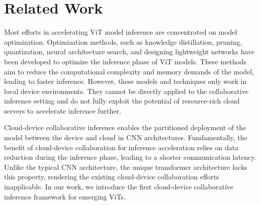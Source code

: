 \section{Related Work}
\label{sec:Related Work}
Most efforts in accelerating ViT model inference are concentrated on model optimization. 
Optimization methods, such as knowledge distillation\cite{hao2022learning}, pruning\cite{pan2021iared,tang2022patch,xu2022evovit,yu2022width,zheng2022savit}, quantization\cite{li2023psaqvit}, neural architecture 
search\cite{you2022shiftaddnas}, 
and designing lightweight networks\cite{yang2022lite} have been developed to optimize the inference phase of ViT models. These methods aim to reduce the computational complexity and memory demands of the model, leading to faster inference. 
However, these models and techniques only work in local device environments. 
They cannot be directly applied to the collaborative inference setting and do not fully exploit the potential of resource-rich cloud servers to accelerate inference further. 

Cloud-device collaborative inference enables the partitioned deployment of the model between the device and cloud in CNN architectures\cite{kang2017neurosurgeona,song2018insitu,jeong2018computation,hu2019dynamic,zeng2019boomerang,li2020edge,laskaridis2020spinna,ren2021finegrained,yang2022cnnpc,zhang2021cloudedgeb}.
Fundamentally, the benefit of cloud-device collaboration for inference acceleration relies on data reduction during the inference phase, leading to a shorter communication latency.  Unlike the typical CNN architecture, the unique transformer architecture lacks this property, rendering the existing cloud-device collaboration efforts inapplicable. 
In our work, we introduce the first cloud-device collaborative inference framework for emerging ViTs.